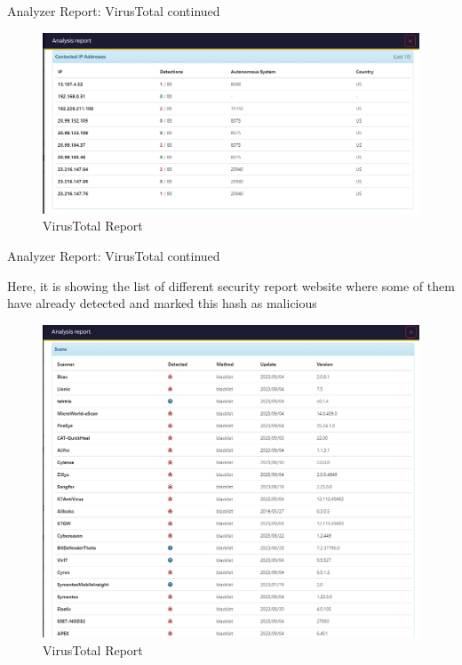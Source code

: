 \begin{frame}{Analyzer Report: VirusTotal continued}
 \begin{figure}[htp]
    \centering
    \includegraphics[scale=0.4]{virusTotal-4.png}
    \caption{VirusTotal Report}
    \label{fig:virusTotal-4}
\end{figure}

\end{frame}

\begin{frame}{Analyzer Report: VirusTotal continued}
\begin{justify}
    Here, it is showing the list of different security report website where some of them have already detected and marked this hash as malicious
\end{justify}
 \begin{figure}[htp]
    \centering
    \includegraphics[scale=0.2]{virusTotal-5.png}
    \caption{VirusTotal Report}
    \label{fig:virusTotal-5}
\end{figure}

\end{frame}

